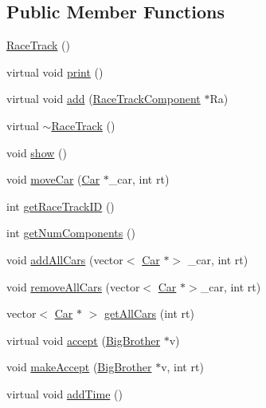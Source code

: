 \subsection*{Public Member Functions}
\begin{DoxyCompactItemize}
\item 
\mbox{\hyperlink{class_race_track_ad258a7a5773bedd7971c572c6b291488}{Race\+Track}} ()
\item 
virtual void \mbox{\hyperlink{class_race_track_afc353278ed272b8deb07283c3c45388e}{print}} ()
\item 
virtual void \mbox{\hyperlink{class_race_track_a1a71ace4706e2e08578111fee2c7eac6}{add}} (\mbox{\hyperlink{class_race_track_component}{Race\+Track\+Component}} $\ast$Ra)
\item 
virtual \mbox{\hyperlink{class_race_track_a6959a7fc3487de846ed56fe5fd10a0ff}{$\sim$\+Race\+Track}} ()
\item 
void \mbox{\hyperlink{class_race_track_ad4d3cc9b17b4cf1173033dc2d0f7ffb5}{show}} ()
\item 
void \mbox{\hyperlink{class_race_track_af5549716e03ebf425f0683f0db4bd825}{move\+Car}} (\mbox{\hyperlink{class_car}{Car}} $\ast$\+\_\+car, int rt)
\item 
int \mbox{\hyperlink{class_race_track_af85156b4218d023460f5287e6b866226}{get\+Race\+Track\+ID}} ()
\item 
int \mbox{\hyperlink{class_race_track_a8870f6bafe0fbb3e693405b23dd40016}{get\+Num\+Components}} ()
\item 
void \mbox{\hyperlink{class_race_track_a14ac008331e0a8945fce4cdb59086ba1}{add\+All\+Cars}} (vector$<$ \mbox{\hyperlink{class_car}{Car}} $\ast$$>$ \+\_\+car, int rt)
\item 
void \mbox{\hyperlink{class_race_track_a4b710e5c818fa6ac2c4701cbee3e8cd3}{remove\+All\+Cars}} (vector$<$ \mbox{\hyperlink{class_car}{Car}} $\ast$$>$\+\_\+car, int rt)
\item 
vector$<$ \mbox{\hyperlink{class_car}{Car}} $\ast$ $>$ \mbox{\hyperlink{class_race_track_abc68bb4172e9db6ebe3dbfb584691512}{get\+All\+Cars}} (int rt)
\item 
virtual void \mbox{\hyperlink{class_race_track_a022988aacbdffd1e0144be3836deeaea}{accept}} (\mbox{\hyperlink{class_big_brother}{Big\+Brother}} $\ast$v)
\item 
void \mbox{\hyperlink{class_race_track_abe1b09c550e3c99eb806ccf24aa74acb}{make\+Accept}} (\mbox{\hyperlink{class_big_brother}{Big\+Brother}} $\ast$v, int rt)
\item 
virtual void \mbox{\hyperlink{class_race_track_a9030a93ab510a49131fcbf1853d2fe81}{add\+Time}} ()
\end{DoxyCompactItemize}
